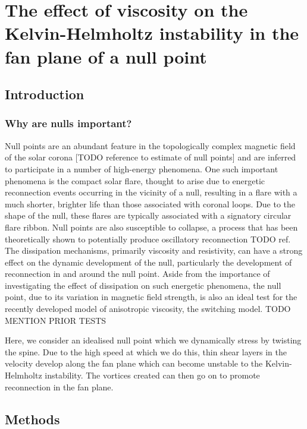 \chapter{The effect of viscosity on the Kelvin-Helmholtz instability in the fan plane of a null point}

\graphicspath{{images/null_point_khi/}}

\section{Introduction}

\subsection{Why are nulls important?}

Null points are an abundant feature in the topologically complex magnetic field of the solar corona [TODO reference to estimate of null points] and are inferred to participate in a number of high-energy phenomena. One such important phenomena is the compact solar flare, thought to arise due to energetic reconnection events occurring in the vicinity of a null, resulting in a flare with a much shorter, brighter life than those associated with coronal loops. Due to the shape of the null, these flares are typically associated with a signatory circular flare ribbon. Null points are also susceptible to collapse, a process that has been theoretically shown to potentially produce oscillatory reconnection TODO ref. The dissipation mechanisms, primarily viscosity and resistivity, can have a strong effect on the dynamic development of the null, particularly the development of reconnection in and around the null point. Aside from the importance of investigating the effect of dissipation on such energetic phenomena, the null point, due to its variation in magnetic field strength, is also an ideal test for the recently developed model of anisotropic viscosity, the switching model. TODO MENTION PRIOR TESTS

Here, we consider an idealised null point which we dynamically stress by twisting the spine. Due to the high speed at which we do this, thin shear layers in the velocity develop along the fan plane which can become unstable to the Kelvin-Helmholtz instability. The vortices created can then go on to promote reconnection in the fan plane. 

\section{Methods}

